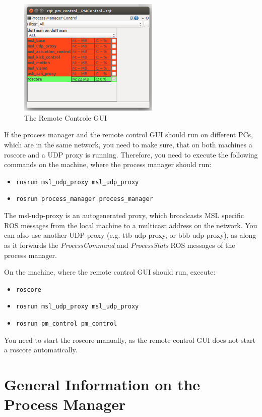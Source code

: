 \begin{figure}[htbp]
 \centering
 \includegraphics[width=0.6\textwidth]{img/ProcManRemoteGUI.png}
 \caption{The Remote Controle GUI}
 \label{fig:ProcManRemoteGUI}
\end{figure}

If the process manager and the remote control GUI should run on different PCs, which are in the same network, you need to make sure, that on both machines a roscore and a UDP proxy is running. Therefore, you need to execute the following commands on the machine, where the process manager should run:
\begin{itemize}
 \item \verb#rosrun msl_udp_proxy msl_udp_proxy#
 \item \verb#rosrun process_manager process_manager#
\end{itemize}
The msl-udp-proxy is an autogenerated proxy, which broadcasts MSL specific ROS messages from the local machine to a multicast address on the network. You can also use another UDP proxy (e.g. ttb-udp-proxy, or bbb-udp-proxy), as along as it forwards the \emph{ProcessCommand} and \emph{ProcessStats} ROS messages of the process manager.

On the machine, where the remote control GUI should run, execute:
\begin{itemize}
 \item \verb#roscore#
 \item \verb#rosrun msl_udp_proxy msl_udp_proxy#
 \item \verb#rosrun pm_control pm_control#
\end{itemize}

You need to start the roscore manually, as the remote control GUI does not start a roscore automatically.

\section{General Information on the Process Manager}
\label{sec:GenProcMan}

